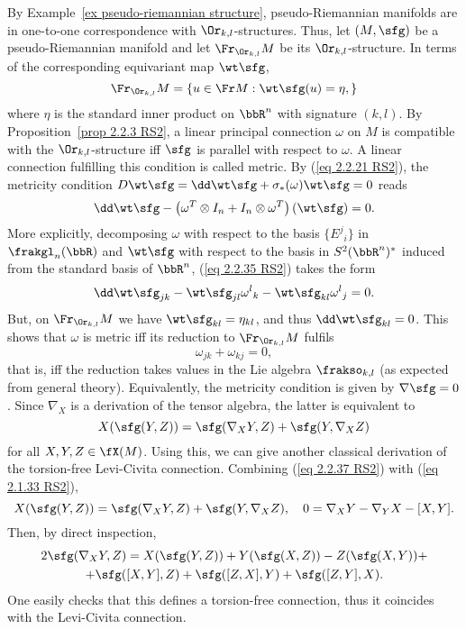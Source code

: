 \begin{example}
    By Example~\ref{ex pseudo-riemannian structure}, pseudo-Riemannian manifolds are in one-to-one correspondence with $\Or_{k,l}$-structures. Thus, let $(M,\sfg)$ be a pseudo-Riemannian manifold and let $\Fr_{\Or_{k,l}} M$ be its $\Or_{k,l}$-structure. In terms of the corresponding equivariant map $\wt\sfg$, 
    \[\Fr_{\Or_{k,l}}M=\{u \in\Fr M:\wt\sfg(u)=\eta,\}\]
    where $\eta$ is the standard inner product on $\bbR^n$ with signature $(k,l)$. By Proposition~\ref{prop 2.2.3 RS2}, a linear principal connection $\omega$ on $M$ is compatible with the $\Or_{k,l}$-structure iff $\sfg$ is parallel with respect to $\omega$. A linear connection fulfilling this condition is called metric. By (\ref{eq 2.2.21 RS2}), the metricity condition $D\wt\sfg=\dd\wt\sfg+\sigma_\ast(\omega)\wt\sfg=0$ reads 
    \[\dd\wt\sfg-\left(\omega^T\otimes I_n+I_n\otimes \omega^T\right)(\wt\sfg)=0.\label{eq 2.2.35 RS2}\]
    More explicitly, decomposing $\omega$ with respect to the basis $\{E^j{}_i\}$ in $\frakgl_n(\bbR)$ and $\wt\sfg$ with respect to the basis in $S^2(\bbR^n)^\ast$ induced from the standard basis of $\bbR^n$, (\ref{eq 2.2.35 RS2}) takes the form 
    \[\dd \wt\sfg_{jk}-\wt\sfg_{jl}\omega^l{}_k-\wt\sfg_{kl}\omega^l{}_j=0.\]
    But, on $\Fr_{\Or_{k,l}} M$ we have $\wt\sfg_{kl}=\eta_{kl}$, and thus $\dd\wt\sfg_{kl}=0$. This shows that $\omega$ is metric iff its reduction to $\Fr_{\Or_{k,l}}M$ fulfils 
    \[\omega_{jk}+\omega_{kj}=0,\]
    that is, iff the reduction takes values in the Lie algebra $\frakso_{k,l}$ (as expected from general theory). Equivalently, the metricity condition is given by $\nabla\sfg=0$. Since $\nabla_X$ is a derivation of the tensor algebra, the latter is equivalent to 
    \[X(\sfg(Y,Z))=\sfg(\nabla_X Y,Z)+\sfg(Y,\nabla_X Z)\label{eq 2.2.37 RS2}\]
    for all $X,Y,Z\in\fX(M)$. Using this, we can give another classical derivation of the torsion-free Levi-Civita connection. Combining (\ref{eq 2.2.37 RS2}) with (\ref{eq 2.1.33 RS2}), 
    \[X(\sfg(Y,Z))=\sfg(\nabla_X Y,Z)+\sfg(Y,\nabla_X Z),\quad 0=\nabla_X Y-\nabla_Y X-[X,Y].\]
    Then, by direct inspection,
    \begin{multline}
        2\sfg(\nabla_X Y,Z)=X(\sfg(Y,Z))+Y(\sfg(X,Z))-Z(\sfg(X,Y))+\\
        +\sfg([X,Y],Z)+\sfg([Z,X],Y)+\sfg([Z,Y],X).\label{eq 2.2.40 RS2}
    \end{multline}
    One easily checks that this defines a torsion-free connection, thus it coincides with the Levi-Civita connection. 
\end{example}


